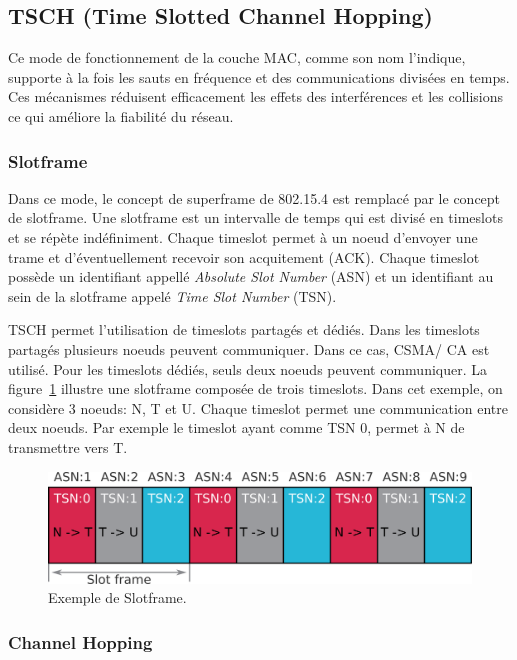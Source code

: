 \subsection*{TSCH (Time Slotted Channel Hopping)}\label{subsec:etat_art-802.15.4.tsch}

Ce mode de fonctionnement de la couche MAC, comme son nom l'indique, supporte à la fois les sauts en fréquence et des communications divisées en temps. Ces mécanismes réduisent efficacement les effets des interférences et les collisions ce qui améliore la fiabilité du réseau.

\subsubsection*{Slotframe}
Dans ce mode, le concept de superframe de 802.15.4 est remplacé par le concept de slotframe.
Une slotframe est un intervalle de temps qui est divisé en timeslots et se répète indéfiniment. Chaque timeslot permet à un noeud d'envoyer une trame et d'éventuellement recevoir son acquitement (ACK).
Chaque timeslot possède un identifiant appellé \textit{Absolute Slot Number} (ASN)
et un identifiant au sein de la slotframe appelé \textit{Time Slot Number} (TSN).

TSCH permet l'utilisation de timeslots partagés et dédiés. Dans les timeslots partagés plusieurs noeuds peuvent communiquer. Dans ce cas, CSMA/ CA est utilisé. Pour les timeslots dédiés, seuls deux noeuds peuvent communiquer. La figure~\ref{fig:state-slotframe} illustre une slotframe composée de trois timeslots.
Dans cet exemple, on considère 3 noeuds: N, T et U. Chaque timeslot permet une communication entre deux noeuds.
Par exemple le timeslot ayant comme TSN 0, permet à N de transmettre vers T.

\begin{figure}[H]
  \centering
  \includegraphics[scale=0.7]{res/pictures/sloframe.png}
  \caption{Exemple de Slotframe.}
  \label{fig:state-slotframe}
\end{figure}

\subsubsection*{Channel Hopping}

